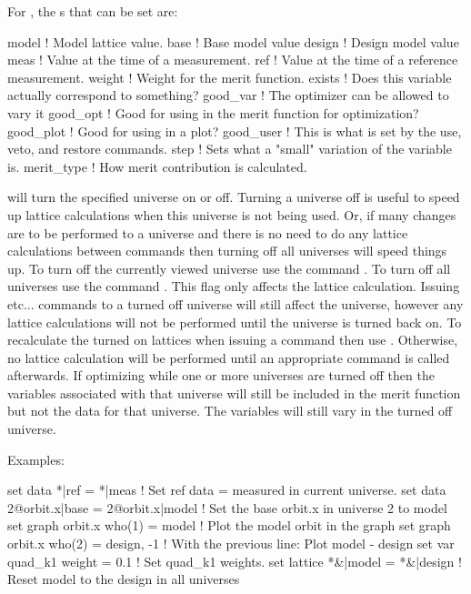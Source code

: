 {For , the s that can be set are:
\begin{example}
  model       ! Model lattice value.
  base        ! Base model value
  design      ! Design model value
  meas        ! Value at the time of a measurement.
  ref         ! Value at the time of a reference measurement.
  weight      ! Weight for the merit function.
  exists      ! Does this variable actually correspond to something?
  good_var    ! The optimizer can be allowed to vary it
  good_opt    ! Good for using in the merit function for optimization?
  good_plot   ! Good for using in a plot?
  good_user   ! This is what is set by the use, veto, and restore commands.
  step        ! Sets what a "small" variation of the variable is.
  merit_type  ! How merit contribution is calculated.
\end{example}
\vskip 0.2in

 will turn the specified universe on or off. Turning
a universe off is useful to speed up lattice calculations when this
universe is not being used. Or, if many changes are to be performed to
a universe and there is no need to do any lattice calculations between
commands then turning off all universes will speed things up. To turn off 
the currently viewed universe use the command . 
To turn off all universes use the command . 
This flag only affects the lattice calculation. 
Issuing  etc...  commands to a turned off universe
will still affect the
universe, however any lattice calculations will not be performed until
the universe is turned back on.  To recalculate the turned on lattices
when issuing a  command then use . Otherwise, no lattice calculation will
be performed until an appropriate command is called afterwards.  If
optimizing while one or more universes are turned off then the
variables associated with that universe will still be included in the
merit function but not the data for that universe. The variables will
still vary in the turned off universe.

Examples:
\begin{example}
  set data *|ref = *|meas               ! Set ref data = measured in current universe.
  set data 2@orbit.x|base = 2@orbit.x|model 
                                        ! Set the base orbit.x in universe 2 to model
  set graph orbit.x who(1) = model      ! Plot the model orbit in the graph
  set graph orbit.x who(2) = design, -1 ! With the previous line: Plot model - design 
  set var quad\_k1 weight = 0.1          ! Set quad\_k1 weights. 
  set lattice *&|model = *&|design      ! Reset model to the design in all universes
\end{example}

}

